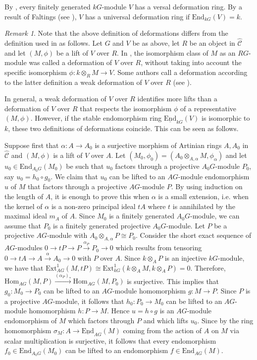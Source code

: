 \documentclass{amsart}
\theoremstyle{plain}
\theoremstyle{definition}
\theoremstyle{remark}
\newtheorem{rem}[thm]{Remark}
\begin{document}
By \cite{maz1}, every finitely generated $kG$-module $V$ has a versal deformation ring.
By a result of Faltings (see \cite[Prop. 7.1]{lendesmit}), $V$ has a universal deformation ring if 
$\mathrm{End}_{kG}(V)=k$.

\begin{rem}
\label{rem:deformations}
Note that the above definition of deformations differs from the definition used in \cite{bl,bc} as follows.
Let $G$ and $V$ be as above, let $R$ be an object in $\hat{\mathcal{C}}$ and let $(M,\phi)$
be a lift of $V$ over $R$. In \cite{bl,bc}, the isomorphism class of $M$ as an $RG$-module was called a 
deformation of $V$ over $R$, without taking into account the specific isomorphism 
$\phi:k\otimes_RM\to V$. Some authors call a deformation according to the latter definition 
a weak deformation of $V$ over $R$ (see \cite[\S 5.2]{keller}). 

In general, a weak deformation of $V$ over $R$ identifies more lifts than a deformation of $V$ over $R$
that respects the isomorphism $\phi$ of a representative $(M,\phi)$.
However, if the stable
endomorphism ring $\underline{\mathrm{End}}_{kG}(V)$ is isomorphic to $k$, these two definitions
of deformations coincide. This can be seen as follows. 

Suppose first that $\alpha:A\to A_0$ is a surjective
morphism of Artinian rings $A,A_0$ in $\hat{\mathcal{C}}$ and $(M,\phi)$ is a lift of $V$ over
$A$. Let $(M_0,\phi_0)=(A_0\otimes_{A,\alpha}M,\phi_\alpha)$ and let $u_0\in\mathrm{End}_{A_0G}(M_0)$ be
such that $u_0$ factors through a projective $A_0G$-module $P_0$, say $u_0=h_0\circ g_0$. 
We claim that $u_0$ can be lifted to an $AG$-module endomorphism $u$ of $M$ that factors 
through a projective $AG$-module $P$.
By using induction on the length of $A$, it is enough to prove this when $\alpha$ is a small extension, i.e.
when the kernel of $\alpha$ is a non-zero
principal ideal $tA$ where $t$ is annihilated by the maximal ideal $m_A$ of $A$. 
Since $M_0$ is a finitely generated $A_0G$-module, we can assume that $P_0$ is a finitely 
generated projective $A_0G$-module. Let $P$ be a projective $AG$-module with $A_0\otimes_{A,\alpha}
P\cong P_0$. 
Consider the short exact sequence of $AG$-modules $0\to tP\to P\xrightarrow{\alpha_P} P_0\to 0$ which 
results from tensoring $0\to tA \to A \xrightarrow{\alpha} A_0\to 0$ with $P$ over $A$.
Since $k\otimes_A P$ is an injective $kG$-module, we have that
$\mathrm{Ext}^1_{AG}(M,tP)\cong \mathrm{Ext}^1_{kG}(k\otimes_AM,k\otimes_A P)= 0$. Therefore,
$\mathrm{Hom}_{AG}(M,P)\xrightarrow{(\alpha_P)_*}\mathrm{Hom}_{AG}(M,P_0)$ is surjective.
This implies that $g_0:M_0\to P_0$ can be
lifted to an $AG$-module homomorphism $g:M\to P$. Since $P$ is a projective $AG$-module, it
follows that $h_0:P_0\to M_0$ can be lifted to an $AG$-module homomorphism $h:P\to M$.
Hence $u=h\circ g$ is an $AG$-module endomorphism of $M$ which factors through $P$ and which
lifts $u_0$. Since by \cite[Lemma 2.3]{bc} the ring homomorphism 
$\sigma_M:A\to \underline{\mathrm{End}}_{AG}(M)$ coming from the action of
$A$ on $M$ via scalar multiplication is surjective, it follows that every endomorphism 
$f_0\in\mathrm{End}_{A_0G}(M_0)$ can be lifted to an endomorphism $f\in\mathrm{End}_{AG}(M)$.


\end{rem}
\end{document}
